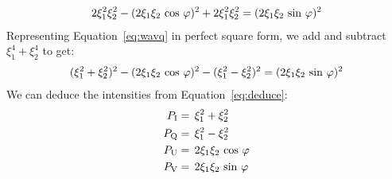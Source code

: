 \begin{equation}
  \begin{aligned}
   2\xi_{\rm 1}^{2}\xi_{\rm 2}^{2} - (2\xi_{\rm 1}\xi_{\rm 2}\, \cos\, \varphi )^2 + 2\xi_{\rm 1}^{2}\xi_{\rm 2}^{2} = (2\xi_{\rm 1}\xi_{\rm 2}\, \sin\, \varphi )^2
  \end{aligned}
  \label{eq:wavq}
 \end{equation} 
Representing Equation~\ref{eq:wavq} in perfect square form, we add and subtract $\xi_{1}^{4} + \xi_{2}^{4}$ to get:
\begin{equation}
  \begin{aligned}
   (\xi_{\rm 1}^{2} + \xi_{\rm 2}^{2})^2 - (2\xi_{\rm 1}\xi_{\rm 2}\, \cos\, \varphi )^2 - (\xi_{\rm 1}^{2} - \xi_{\rm 2}^{2})^2 = (2\xi_{\rm 1}\xi_{\rm 2}\, \sin\, \varphi )^2
  \end{aligned}
  \label{eq:deduce}
 \end{equation} 
We can deduce the intensities from Equation~\ref{eq:deduce}:
\begin{subequations}\label{eq:stok}
\begin{align}
P_{\rm I}  & =\,  \xi_{\rm 1}^{2} + \xi_{\rm 2}^{2}	 	\label{eq:stoka} \\
P_{\rm Q} & =\,  \xi_{\rm 1}^{2} - \xi_{\rm 2}^{2} 		\label{eq:stokb} \\
P_{\rm U}  & =\,  2\xi_{\rm 1}\xi_{\rm 2}\, \cos\, \varphi 		\label{eq:stokc} \\ 
P_{\rm V}  & =\,  2\xi_{\rm 1}\xi_{\rm 2}\, \sin\, \varphi  	\label{eq:stokd} 
\end{align}
\end{subequations}
%


